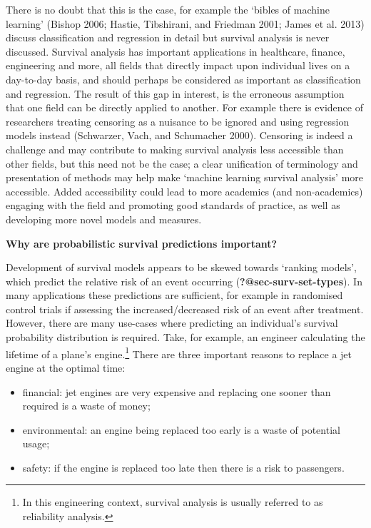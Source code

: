 \documentclass[
  letterpaper,
]{scrbook}
\providecommand{\tightlist}{%
  \setlength{\itemsep}{0pt}\setlength{\parskip}{0pt}}\usepackage{longtable,booktabs,array}
\theoremstyle{plain}
\theoremstyle{definition}
\theoremstyle{remark}
\begin{document}
There is no doubt that this is the case, for example the `bibles of
machine learning' (Bishop 2006; Hastie, Tibshirani, and Friedman 2001;
James et al. 2013) discuss classification and regression in detail but
survival analysis is never discussed. Survival analysis has important
applications in healthcare, finance, engineering and more, all fields
that directly impact upon individual lives on a day-to-day basis, and
should perhaps be considered as important as classification and
regression. The result of this gap in interest, is the erroneous
assumption that one field can be directly applied to another. For
example there is evidence of researchers treating censoring as a
nuisance to be ignored and using regression models instead (Schwarzer,
Vach, and Schumacher 2000). Censoring is indeed a challenge and may
contribute to making survival analysis less accessible than other
fields, but this need not be the case; a clear unification of
terminology and presentation of methods may help make `machine learning
survival analysis' more accessible. Added accessibility could lead to
more academics (and non-academics) engaging with the field and promoting
good standards of practice, as well as developing more novel models and
measures.

\textbf{Why are probabilistic survival predictions important?}

Development of survival models appears to be skewed towards `ranking
models', which predict the relative risk of an event occurring
(\textbf{?@sec-surv-set-types}). In many applications these predictions
are sufficient, for example in randomised control trials if assessing
the increased/decreased risk of an event after treatment. However, there
are many use-cases where predicting an individual's survival probability
distribution is required. Take, for example, an engineer calculating the
lifetime of a plane's engine.\footnote{In this engineering context,
  survival analysis is usually referred to as reliability analysis.}
There are three important reasons to replace a jet engine at the optimal
time:

\begin{itemize}
\tightlist
\item
  financial: jet engines are very expensive and replacing one sooner
  than required is a waste of money;
\item
  environmental: an engine being replaced too early is a waste of
  potential usage;
\item
  safety: if the engine is replaced too late then there is a risk to
  passengers.
\end{itemize}
\end{document}
